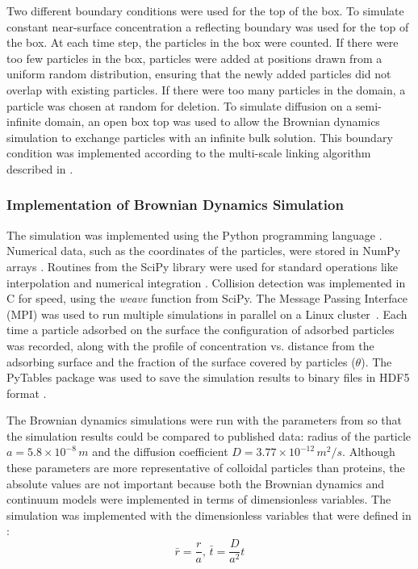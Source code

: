 Two different boundary conditions were used for the top of the box.
To simulate constant near-surface concentration a reflecting boundary
was used for the top of the box. At each time step, the particles
in the box were counted. If there were too few particles in the box,
particles were added at positions drawn from a uniform random distribution,
ensuring that the newly added particles did not overlap with existing
particles. If there were too many particles in the domain, a particle
was chosen at random for deletion. To simulate diffusion on a semi-infinite
domain, an open box top was used to allow the Brownian dynamics simulation
to exchange particles with an infinite bulk solution. This boundary
condition was implemented according to the multi-scale linking algorithm
described in \cite{Magan2004}. 


\subsubsection{Implementation of Brownian Dynamics Simulation}

The simulation was implemented using the Python programming language
. Numerical data, such as the coordinates of the particles, were stored
in NumPy arrays \cite{Oliphant2006}. Routines from the SciPy library
were used for standard operations like interpolation and numerical
integration \cite{Oliphant2007}. Collision detection was implemented
in C for speed, using the \emph{weave} function from SciPy. The Message
Passing Interface (MPI) was used to run multiple simulations in parallel
on a Linux cluster~\cite{MPI}. Each time a particle adsorbed on
the surface the configuration of adsorbed particles was recorded,
along with the profile of concentration vs. distance from the adsorbing
surface and the fraction of the surface covered by particles ($\theta$).
The PyTables package was used to save the simulation results to binary
files in HDF5 format \cite{Alted2002-,HDFGroup2000-}. 

The Brownian dynamics simulations were run with the parameters from
\cite{Magan2004} so that the simulation results could be compared
to published data: radius of the particle $a=5.8\times10^{-8}\, m$
and the diffusion coefficient $D=3.77\times10^{-12}\, m^{2}/s$. Although
these parameters are more representative of colloidal particles than
proteins, the absolute values are not important because both the Brownian
dynamics and continuum models were implemented in terms of dimensionless
variables. The simulation was implemented with the dimensionless variables
that were defined in \cite{Magan2004}:\begin{equation}
\bar{r}=\frac{r}{a},\,\bar{t}=\frac{D}{a^{2}}t\label{eq:Dimensionless variables}\end{equation}



